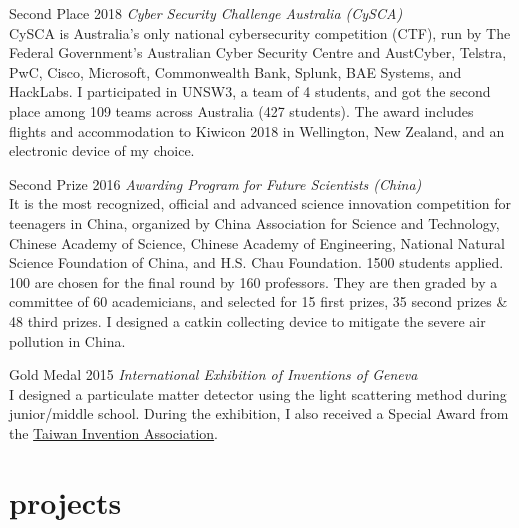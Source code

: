 \documentclass[hidelinks__VERSION__]{adamyi-cv}
\begin{document}
\begin{entrylist}


\entry
{Second Place}
{2018}
{\emph{Cyber Security Challenge Australia (CySCA)}\\
CySCA is Australia’s only national cybersecurity competition (CTF), run by The Federal Government’s Australian Cyber Security Centre and AustCyber, Telstra, PwC, Cisco, Microsoft, Commonwealth Bank, Splunk, BAE Systems, and HackLabs. I participated in UNSW3, a team of 4 students, and got the second place among 109 teams across Australia (427 students). The award includes flights and accommodation to Kiwicon 2018 in Wellington, New Zealand, and an electronic device of my choice.
}


\entry
{Second Prize}
{2016}
{\emph{Awarding Program for Future Scientists (China)}\\
It is the most recognized, official and advanced science innovation competition for teenagers in China, organized by China Association for Science and Technology, Chinese Academy of Science, Chinese Academy of Engineering, National Natural Science Foundation of China, and H.S. Chau Foundation. 1500 students applied. 100 are chosen for the final round by 160 professors. They are then graded by a committee of 60 academicians, and selected for 15 first prizes, 35 second prizes \& 48 third prizes. I designed a catkin collecting device to mitigate the severe air pollution in China.
}


\entry
{Gold Medal}
{2015}
{\emph{International Exhibition of Inventions of Geneva}\\
I designed a particulate matter detector using the light scattering method during junior/middle school. During the exhibition, I also received a Special Award from the \href{http://www.tia-tw.net/}{Taiwan Invention Association}.
}


\end{entrylist}


\section{projects}
\end{document}
